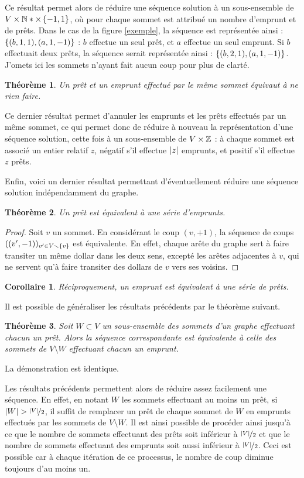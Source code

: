 \documentclass{article}
\newtheorem{theorem}{Théorème}
\newtheorem{corollary}{Corollaire}[theorem]
\begin{document}
Ce résultat permet alors de réduire une séquence solution à un sous-ensemble de $V\times\N*\times\set{-1, 1}$, où pour chaque sommet est attribué un nombre d'emprunt et de prêts.
Dans le cas de la figure \ref{exemple}, la séquence est représentée ainsi : $\set{(b, 1, 1), (a, 1, -1)}$ : $b$ effectue un seul prêt, et $a$ effectue un seul emprunt. Si $b$ effectuait deux prêts, la séquence serait représentée ainsi : $\set{(b, 2, 1), (a, 1, -1)}$. J'omets ici les sommets n'ayant fait aucun coup pour plus de clarté.

\begin{theorem}
	Un prêt et un emprunt effectué par le même sommet équivaut à ne rien faire.
\end{theorem}
Ce dernier résultat permet d'annuler les emprunts et les prêts effectués par un même sommet, ce qui permet donc de réduire à nouveau la représentation d'une séquence solution, cette fois à un sous-ensemble de $V\times\mathbb Z$ : à chaque sommet est associé un entier relatif $z$, négatif s'il effectue $\abs{z}$ emprunts, et positif s'il effectue $z$ prêts.

Enfin, voici un dernier résultat permettant d'éventuellement réduire une séquence solution indépendamment du graphe.

\begin{theorem}
	Un prêt est équivalent à une série d'emprunts.
\end{theorem}
\begin{proof}
	Soit $v$ un sommet. En considérant le coup $(v, +1)$, la séquence de coups $((v', -1))_{v'\in V \setminus \set{v}}$ est équivalente.
	En effet, chaque arête du graphe sert à faire transiter un même dollar dans les deux sens, excepté les arêtes adjacentes à $v$, qui ne servent qu'à faire transiter des dollars de $v$ vers ses voisins.
\end{proof}
\begin{corollary}
	Réciproquement, un emprunt est équivalent à une série de prêts.
\end{corollary}

Il est possible de généraliser les résultats précédents par le théorème suivant.
\begin{theorem}
	Soit $W \subset V$ un sous-ensemble des sommets d'un graphe effectuant chacun un prêt. Alors la séquence correspondante est équivalente à celle des sommets de $V \setminus W$ effectuant chacun un emprunt.
\end{theorem}
La démonstration est identique.

Les résultats précédents permettent alors de réduire assez facilement une séquence.
En effet, en notant $W$ les sommets effectuant au moins un prêt, si $\left|W\right| > \nicefrac{\left|V\right|}{2}$, il suffit de remplacer un prêt de chaque sommet de $W$ en emprunts effectués par les sommets de $V \setminus W$.
Il est ainsi possible de procéder ainsi jusqu'à ce que le nombre de sommets effectuant des prêts soit inférieur à $\nicefrac{\left|V\right|}{2}$ et que le nombre de sommets effectuant des emprunts soit aussi inférieur à $\nicefrac{\left|V\right|}{2}$. Ceci est possible car à chaque itération de ce processus, le nombre de coup diminue toujours d'au moins un.
\end{document}
